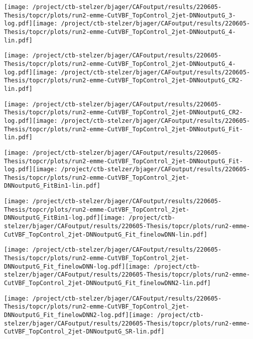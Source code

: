 \documentclass{article}
\begin{document}
\texttt{[image: /project/ctb-stelzer/bjager/CAFoutput/results/220605-Thesis/topcr/plots/run2-emme-CutVBF\_TopControl\_2jet-DNNoutputG\_3-log.pdf]}\texttt{[image: /project/ctb-stelzer/bjager/CAFoutput/results/220605-Thesis/topcr/plots/run2-emme-CutVBF\_TopControl\_2jet-DNNoutputG\_4-lin.pdf]}

\texttt{[image: /project/ctb-stelzer/bjager/CAFoutput/results/220605-Thesis/topcr/plots/run2-emme-CutVBF\_TopControl\_2jet-DNNoutputG\_4-log.pdf]}\texttt{[image: /project/ctb-stelzer/bjager/CAFoutput/results/220605-Thesis/topcr/plots/run2-emme-CutVBF\_TopControl\_2jet-DNNoutputG\_CR2-lin.pdf]}

\texttt{[image: /project/ctb-stelzer/bjager/CAFoutput/results/220605-Thesis/topcr/plots/run2-emme-CutVBF\_TopControl\_2jet-DNNoutputG\_CR2-log.pdf]}\texttt{[image: /project/ctb-stelzer/bjager/CAFoutput/results/220605-Thesis/topcr/plots/run2-emme-CutVBF\_TopControl\_2jet-DNNoutputG\_Fit-lin.pdf]}

\texttt{[image: /project/ctb-stelzer/bjager/CAFoutput/results/220605-Thesis/topcr/plots/run2-emme-CutVBF\_TopControl\_2jet-DNNoutputG\_Fit-log.pdf]}\texttt{[image: /project/ctb-stelzer/bjager/CAFoutput/results/220605-Thesis/topcr/plots/run2-emme-CutVBF\_TopControl\_2jet-DNNoutputG\_FitBin1-lin.pdf]}

\texttt{[image: /project/ctb-stelzer/bjager/CAFoutput/results/220605-Thesis/topcr/plots/run2-emme-CutVBF\_TopControl\_2jet-DNNoutputG\_FitBin1-log.pdf]}\texttt{[image: /project/ctb-stelzer/bjager/CAFoutput/results/220605-Thesis/topcr/plots/run2-emme-CutVBF\_TopControl\_2jet-DNNoutputG\_Fit\_finelowDNN-lin.pdf]}

\texttt{[image: /project/ctb-stelzer/bjager/CAFoutput/results/220605-Thesis/topcr/plots/run2-emme-CutVBF\_TopControl\_2jet-DNNoutputG\_Fit\_finelowDNN-log.pdf]}\texttt{[image: /project/ctb-stelzer/bjager/CAFoutput/results/220605-Thesis/topcr/plots/run2-emme-CutVBF\_TopControl\_2jet-DNNoutputG\_Fit\_finelowDNN2-lin.pdf]}

\texttt{[image: /project/ctb-stelzer/bjager/CAFoutput/results/220605-Thesis/topcr/plots/run2-emme-CutVBF\_TopControl\_2jet-DNNoutputG\_Fit\_finelowDNN2-log.pdf]}\texttt{[image: /project/ctb-stelzer/bjager/CAFoutput/results/220605-Thesis/topcr/plots/run2-emme-CutVBF\_TopControl\_2jet-DNNoutputG\_SR-lin.pdf]}
\end{document}
